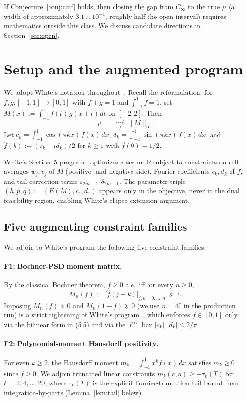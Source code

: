 \documentclass[11pt]{article}
\theoremstyle{plain}
\theoremstyle{definition}
\begin{document}
If Conjecture~\ref{conj:cinf} holds, then closing the gap from
$C_\infty$ to the true $\mu$ (a width of approximately $3.1 \times
10^{-4}$, roughly half the open interval) requires mathematics outside
this class. We discuss candidate directions in Section~\ref{sec:open}.

\section{Setup and the augmented program}\label{sec:setup}

We adopt White's notation throughout~\cite[\S2]{White2023}. Recall the
reformulation: for $f, g : [-1, 1] \to [0, 1]$ with $f + g = 1$ and
$\int_{-1}^1 f = 1$, set
\(
M(x) := \int_{-1}^1 f(t)\, g(x + t)\, dt
\)
on $[-2, 2]$. Then
\[
\mu \;=\; \inf_f\, \|M\|_\infty.
\]
Let $c_k = \int_{-1}^1 \cos(\pi k x)\, f(x)\, dx$,
$d_k = \int_{-1}^1 \sin(\pi k x)\, f(x)\, dx$, and
$\hat f(k) := (c_k - i d_k)/2$ for $k \ge 1$ with $\hat f(0) = 1/2$.

White's Section~5 program~\cite[\S5]{White2023} optimizes a scalar
$\Omega$ subject to constraints on cell averages $w_j, v_j$ of $M$
(positive- and negative-side), Fourier coefficients $c_k, d_k$ of $f$,
and tail-correction terms $\varepsilon_{2m-1}, \delta_{2m-1}$. The
parameter triple $(h, p, q) := (E(M), c_1, d_1)$ appears only in the
objective, never in the dual feasibility region, enabling White's
ellipse-extension argument.

\subsection{Five augmenting constraint families}\label{sec:families}

We adjoin to White's program the following five constraint families.

\paragraph{F1: Bochner-PSD moment matrix.} By the classical Bochner
theorem, $f \ge 0$ a.e.\ iff for every $n \ge 0$,
\[
M_n(f) := \bigl[\hat f(j - k)\bigr]_{j,k = 0,\dots,n} \;\succeq\; 0.
\]
Imposing $M_n(f) \succeq 0$ and $M_n(1 - f) \succeq 0$ (we use
$n=40$ in the production run) is a strict tightening of White's
program~\cite[\S5]{White2023}, which enforces $f \in [0, 1]$ only via
the bilinear form in (5.5) and via the $\ell^\infty$ box
$|c_k|, |d_k| \le 2/\pi$.

\paragraph{F2: Polynomial-moment Hausdorff positivity.} For
even $k \ge 2$, the Hausdorff moment $m_k = \int_{-1}^1 x^k f(x)\, dx$
satisfies $m_k \ge 0$ since $f \ge 0$. We adjoin truncated linear
constraints $m_k(c, d) \ge -\tau_k(T)$ for $k = 2, 4, \dots, 20$, where
$\tau_k(T)$ is the explicit Fourier-truncation tail bound from
integration-by-parts (Lemma~\ref{lem:tail} below).
\end{document}
